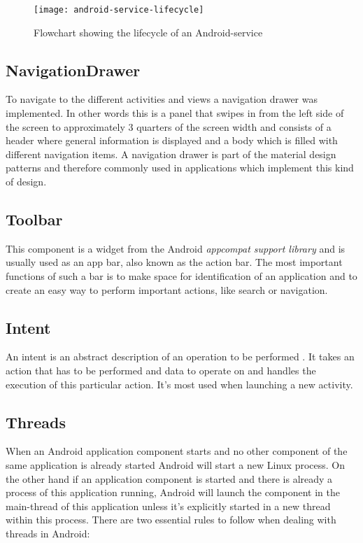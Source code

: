 \begin{figure}[H]
	\centering
	\texttt{[image: android-service-lifecycle]}
	\caption{Flowchart showing the lifecycle of an Android-service}
	\label{fig:servicelifecycle}
\end{figure}

\subsection{NavigationDrawer}
To navigate to the different activities and views a navigation drawer was implemented. In other words this is a panel that swipes in from the left side of the screen to approximately 3 quarters of the screen width and consists of a header where general information is displayed and a body which is filled with different navigation items. A navigation drawer is part of the material design patterns and therefore commonly used in applications which implement this kind of design.

\subsection{Toolbar}
This component is a widget from the Android \emph{appcompat support library} and is usually used as an app bar, also known as the action bar. The most important functions of such a bar is to make space for identification of an application and to create an easy way to perform important actions, like search or navigation.

\subsection{Intent}
An intent is an abstract description of an operation to be performed \cite{AndroidIntent}. It takes an action that has to be performed and data to operate on and handles the execution of this particular action. It's most used when launching a new activity.

\subsection{Threads}
When an Android application component starts and no other component of the same application is already started Android will start a new Linux process. On the other hand if an application component is started and there is already a process of this application running, Android will launch the component in the main-thread of this application unless it's explicitly started in a new thread within this process. There are two essential rules to follow when dealing with threads in Android:

